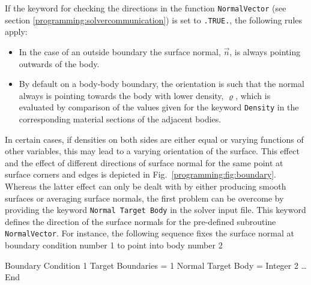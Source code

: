 If the keyword for checking the directions in the function \texttt{NormalVector} (see section \ref{programming:solvercommunication}) is set to \texttt{.TRUE.}, the following rules apply:
\begin{itemize}
\item In the case of an outside boundary the surface normal, $\vec{n}$, is always pointing outwards of the body.
\item By default on a body-body boundary, the orientation is such that the normal always is pointing towards the body with lower density, $\varrho$, which is evaluated by comparison of the values given for the keyword \texttt{Density} in the corresponding material sections of the adjacent bodies.
\end{itemize}
In certain cases, if densities on both sides are either equal or varying functions of other variables, this may lead to a varying orientation of the surface. This effect and the effect of different directions of surface normal for the same point at surface corners and edges is depicted in Fig.~\ref{programming:fig:boundary}. Whereas the latter effect can only be dealt with by either producing smooth surfaces or averaging surface normals, the first problem can be overcome by providing the keyword \texttt{Normal Target Body} in the solver input file. This keyword defines the direction of the surface normals for the pre-defined subroutine \texttt{NormalVector}. For instance, the following sequence fixes the surface normal at boundary condition number 1 to point into body number 2

\ttbegin
Boundary Condition 1
  Target Boundaries = 1
  Normal Target Body = Integer 2
\ldots
End
\ttend
